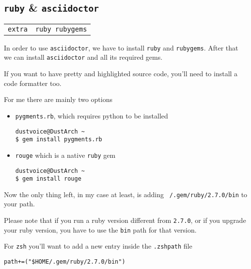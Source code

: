 \documentclass[9pt]{report}
\newenvironment{NOTE}
{\begin{tcolorbox}[colback=admonitionBG,coltitle=draculaFG,colframe=draculaBlue,colbacktitle=draculaBlue,title=NOTE]}
{\end{tcolorbox}}
\newenvironment{packagetable}
{\begin{longtabu}to \textwidth [b]{X[1,r]|X[1,l]}}
{\end{longtabu}}
\begin{document}
\hypertarget{x-ruby-and-asciidoctor}{\subsection{\texttt{ruby} \& \texttt{asciidoctor}}}
\begin{packagetable}
    \texttt{extra} & \texttt{ruby rubygems} \\ 
\end{packagetable}

In order to use \texttt{asciidoctor}, we have to install \texttt{ruby} and \texttt{rubygems}.
After that we can install \texttt{asciidoctor} and all its required gems.


\begin{NOTE}
    If you want to have pretty and highlighted source code, you’ll need to install a code formatter too.


    For me there are mainly two options


    \begin{itemize}

        \item \texttt{pygments.rb}, which requires python to be installed

            \begin{verbatim}
dustvoice@DustArch ~
$ gem install pygments.rb
            \end{verbatim}
        \item \texttt{rouge} which is a native \texttt{ruby} gem

            \begin{verbatim}
dustvoice@DustArch ~
$ gem install rouge
            \end{verbatim}
    \end{itemize}

\end{NOTE}
Now the only thing left, in my case at least, is adding \texttt{~/.gem/ruby/2.7.0/bin} to your path.


\begin{NOTE}
    Please note that if you run a ruby version different from \texttt{2.7.0}, or if you upgrade your ruby version, you have to use the \texttt{bin} path for that version.

\end{NOTE}
For \texttt{zsh} you’ll want to add a new entry inside the \texttt{.zshpath} file


\begin{verbatim}
path+=("$HOME/.gem/ruby/2.7.0/bin")
\end{verbatim}
\end{document}
